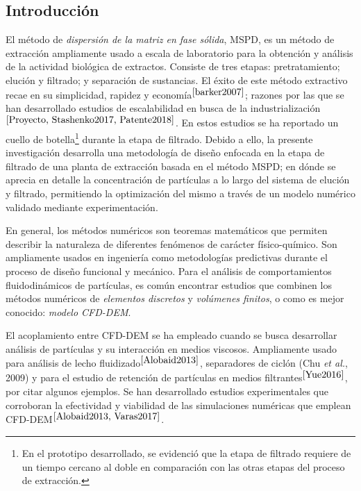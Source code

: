 \begin{center}
	\section{Introducci\'on}
\end{center}

\noindent
\justify

El m\'etodo de \textit{dispersi\'on de la matriz en fase s\'olida}, MSPD, es un m\'etodo de extracci\'on ampliamente usado a escala de laboratorio para la obtenci\'on y an\'alisis de la actividad biol\'ogica de extractos. Consiste de tres etapas: pretratamiento; eluci\'on y filtrado; y separaci\'on de sustancias. El \'exito de este m\'etodo extractivo recae en su simplicidad, rapidez y econom\'ia$^{\cite{barker2007}}$; razones por las que se han desarrollado estudios de escalabilidad en busca de la industrializaci\'on$^{\cite{Proyecto, Stashenko2017, Patente2018}}$. En estos estudios se ha reportado un cuello de botella\footnote{En el prototipo desarrollado, se evidenci\'o que la etapa de filtrado requiere de un tiempo cercano al doble en comparaci\'on con las otras etapas del proceso de extracci\'on.} durante la etapa de filtrado. Debido a ello, la presente investigaci\'on desarrolla una metodolog\'ia de dise\~no enfocada en la etapa de filtrado de una planta de extracci\'on basada en el m\'etodo MSPD; en d\'onde se aprecia en detalle la concentraci\'on de part\'iculas a lo largo del sistema de eluci\'on y filtrado, permitiendo la optimizaci\'on del mismo a trav\'es de un modelo num\'erico validado mediante experimentaci\'on.

\noindent
\justify

En general, los m\'etodos num\'ericos son teoremas matem\'aticos que permiten describir la naturaleza de diferentes fen\'omenos de car\'acter f\'isico-qu\'imico. Son ampliamente usados en ingenier\'ia como metodolog\'ias predictivas durante el proceso de dise\~no funcional y mec\'anico. Para el an\'alisis de comportamientos fluidodin\'amicos de part\'iculas, es com\'un encontrar estudios que combinen los m\'etodos num\'ericos de \textit{elementos discretos} y \textit{vol\'umenes finitos}, o como es mejor conocido: \textit{modelo CFD-DEM}.

\noindent
\justify

El acoplamiento entre CFD-DEM se ha empleado cuando se busca desarrollar an\'alisis de part\'iculas y su interacci\'on en medios viscosos. Ampliamente usado para an\'alisis de lecho fluidizado$^{\cite{Alobaid2013}}$, separadores de cicl\'on (Chu \textit{et al.}, 2009) y para el estudio de retenci\'on de part\'iculas en medios filtrantes$^{\cite{Yue2016}}$, por citar algunos ejemplos. Se han desarrollado estudios experimentales que corroboran la efectividad y viabilidad de las simulaciones num\'ericas que emplean CFD-DEM$^{\cite{Alobaid2013, Varas2017}}$.

